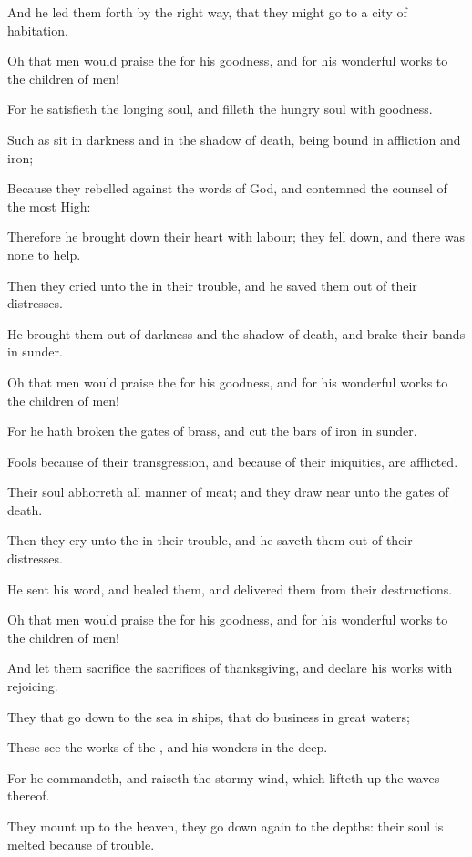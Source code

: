 \Verse And he led them forth by the right way, that they might go to a city of habitation.

\Verse Oh that men would praise the \LORD for his goodness, and for his wonderful works to the children of men!

\Verse For he satisfieth the longing soul, and filleth the hungry soul with goodness.

\Verse Such as sit in darkness and in the shadow of death, being bound in affliction and iron;

\Verse Because they rebelled against the words of God, and contemned the counsel of the most High:

\Verse Therefore he brought down their heart with labour; they fell down, and there was none to help.

\Verse Then they cried unto the \LORD in their trouble, and he saved them out of their distresses.

\Verse He brought them out of darkness and the shadow of death, and brake their bands in sunder.

\Verse Oh that men would praise the \LORD for his goodness, and for his wonderful works to the children of men!

\Verse For he hath broken the gates of brass, and cut the bars of iron in sunder.

\Verse Fools because of their transgression, and because of their iniquities, are afflicted.

\Verse Their soul abhorreth all manner of meat; and they draw near unto the gates of death.

\Verse Then they cry unto the \LORD in their trouble, and he saveth them out of their distresses.

\Verse He sent his word, and healed them, and delivered them from their destructions.

\Verse Oh that men would praise the \LORD for his goodness, and for his wonderful works to the children of men!

\Verse And let them sacrifice the sacrifices of thanksgiving, and declare his works with rejoicing.

\Verse They that go down to the sea in ships, that do business in great waters;

\Verse These see the works of the \LORD, and his wonders in the deep.

\Verse For he commandeth, and raiseth the stormy wind, which lifteth up the waves thereof.

\Verse They mount up to the heaven, they go down again to the depths: their soul is melted because of trouble.


